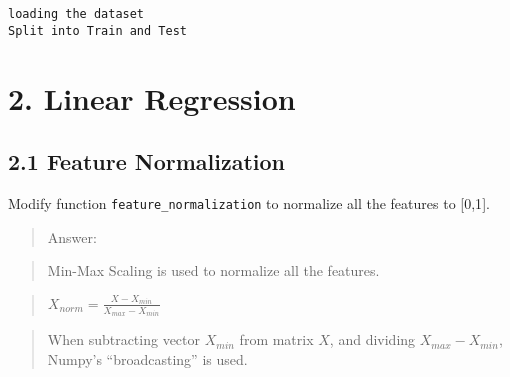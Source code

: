 \documentclass{article}
\begin{document}
    \begin{Verbatim}[commandchars=\\\{\}]
loading the dataset
Split into Train and Test
    \end{Verbatim}

    \section{2. Linear Regression}\label{linear-regression}

    \subsection{2.1 Feature Normalization}\label{feature-normalization}

Modify function \texttt{feature\_normalization} to normalize all the
features to {[}0,1{]}.

\begin{quote}
Answer:
\end{quote}

\begin{quote}
Min-Max Scaling is used to normalize all the features.
\end{quote}

\begin{quote}
\(X_{norm} = \frac{X-X_{min}}{X_{max}-X_{min}}\)
\end{quote}

\begin{quote}
When subtracting vector \(X_{min}\) from matrix \(X\), and dividing
\(X_{max}-X_{min}\), Numpy's ``broadcasting'' is used.
\end{quote}
\end{document}
